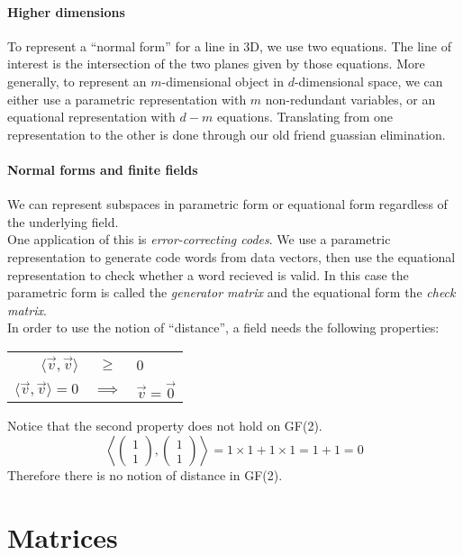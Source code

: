 \documentclass{article}
\begin{document}
\paragraph{Higher dimensions} To represent a ``normal form'' for a line in 3D, we use two equations. The line of interest is the intersection of the two planes given by those equations. More generally, to represent an $m$-dimensional object in $d$-dimensional space, we can either use a parametric representation with $m$ non-redundant variables, or an equational representation with $d-m$ equations. Translating from one representation to the other is done through our old friend guassian elimination.

\paragraph{Normal forms and finite fields} We can represent subspaces in parametric form or equational form regardless of the underlying field.
\vspace{1mm}\\
One application of this is \textit{error-correcting codes}. We use a parametric representation to generate code words from data vectors, then use the equational representation to check whether a word recieved is valid. In this case the parametric form is called the \textit{generator matrix} and the equational form the \textit{check matrix}.
\vspace{1mm}\\
In order to use the notion of ``distance'', a field needs the following properties:
\begin{center}
\begin{tabular}{r c l}
$\langle\vec{v},\vec{v}\rangle$ & $\geq$ & 0\\
$\langle\vec{v},\vec{v}\rangle=0$ & $\implies$ & $\vec{v}=\vec{0}$
\end{tabular}
\end{center}
Notice that the second property does not hold on GF(2).
$$\left\langle\begin{pmatrix}1\\1\end{pmatrix},\begin{pmatrix}1\\1\end{pmatrix}\right\rangle=1\times 1+1\times 1=1+1=0$$
Therefore there is no notion of distance in GF(2).

\section{Matrices}
\end{document}
